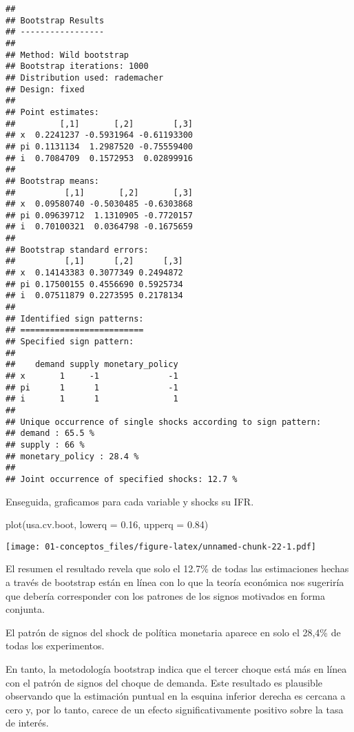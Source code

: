 \documentclass[
]{book}
\newenvironment{Shaded}{\begin{snugshade}}{\end{snugshade}}
\newcommand{\AttributeTok}[1]{\textcolor[rgb]{0.77,0.63,0.00}{#1}}
\newcommand{\FloatTok}[1]{\textcolor[rgb]{0.00,0.00,0.81}{#1}}
\newcommand{\FunctionTok}[1]{\textcolor[rgb]{0.00,0.00,0.00}{#1}}
\newcommand{\NormalTok}[1]{#1}
\begin{document}
\begin{verbatim}
## 
## Bootstrap Results
## ----------------- 
## 
## Method: Wild bootstrap
## Bootstrap iterations: 1000
## Distribution used: rademacher
## Design: fixed
## 
## Point estimates: 
##         [,1]       [,2]        [,3]
## x  0.2241237 -0.5931964 -0.61193300
## pi 0.1131134  1.2987520 -0.75559400
## i  0.7084709  0.1572953  0.02899916
## 
## Bootstrap means: 
##          [,1]       [,2]       [,3]
## x  0.09580740 -0.5030485 -0.6303868
## pi 0.09639712  1.1310905 -0.7720157
## i  0.70100321  0.0364798 -0.1675659
## 
## Bootstrap standard errors: 
##          [,1]      [,2]      [,3]
## x  0.14143383 0.3077349 0.2494872
## pi 0.17500155 0.4556690 0.5925734
## i  0.07511879 0.2273595 0.2178134
## 
## Identified sign patterns: 
## =========================
## Specified sign pattern: 
## 
##    demand supply monetary_policy
## x       1     -1              -1
## pi      1      1              -1
## i       1      1               1
## 
## Unique occurrence of single shocks according to sign pattern: 
## demand : 65.5 % 
## supply : 66 % 
## monetary_policy : 28.4 % 
## 
## Joint occurrence of specified shocks: 12.7 %
\end{verbatim}

Enseguida, graficamos para cada variable y shocks su IFR.

\begin{Shaded}
\begin{Highlighting}[]
\FunctionTok{plot}\NormalTok{(usa.cv.boot, }\AttributeTok{lowerq =} \FloatTok{0.16}\NormalTok{, }\AttributeTok{upperq =} \FloatTok{0.84}\NormalTok{)}
\end{Highlighting}
\end{Shaded}

\texttt{[image: 01-conceptos\_files/figure-latex/unnamed-chunk-22-1.pdf]}

El resumen el resultado revela que solo el 12.7\% de todas las estimaciones hechas a través de bootstrap están en línea con lo que la teoría económica nos sugeriría que debería corresponder con los patrones de los signos motivados en forma conjunta.

El patrón de signos del shock de política monetaria aparece en solo el 28,4\% de todas los experimentos.

En tanto, la metodología bootstrap indica que el tercer choque está más en línea con el patrón de signos del choque de demanda. Este resultado es plausible observando que la estimación puntual en la esquina inferior derecha es cercana a cero y, por lo tanto, carece de un efecto significativamente positivo sobre la tasa de interés.
\end{document}
